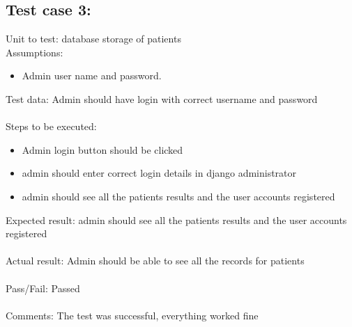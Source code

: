 \documentclass[oneside,12pt]{Classes/VTU}
\begin{document}
	\subsection{Test case 3:}
	Unit to test: database storage of patients\\
	Assumptions:\\
	\begin{itemize}
		\item Admin user name and password.
	\end{itemize}
	Test data: Admin should have login with correct username and password\\
	\\
	Steps to be executed:\\
	\begin{itemize}
		\item Admin login button should be clicked
		\item admin should enter correct login details in django administrator
		\item admin should see all the patients results and the user accounts registered
	\end{itemize}
	Expected result:  admin should see all the patients results and the user accounts registered\\
	\\
	Actual result: Admin should be able to see all the records for patients\\
	\\
	Pass/Fail: Passed\\
	\\
	Comments: The test was successful, everything worked fine
	
\end{document}
